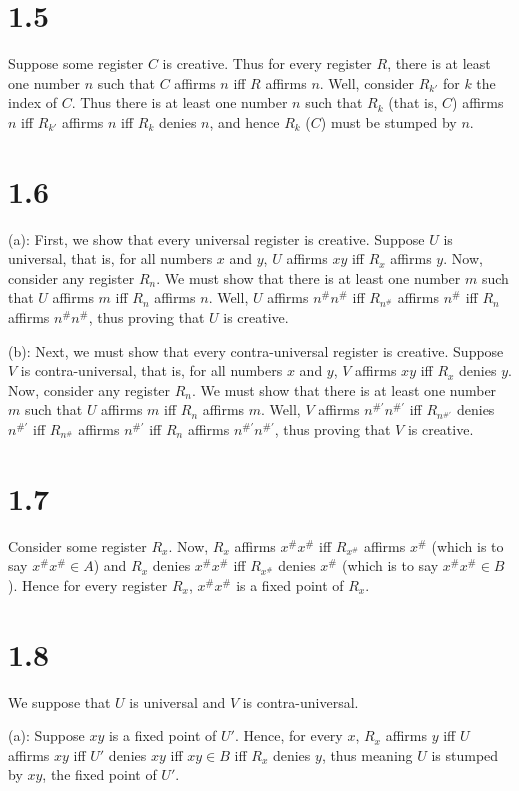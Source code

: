 \documentclass{article}
\theoremstyle{definition}
\begin{document}
\section*{1.5}
Suppose some register $C$ is creative. Thus for every register $R$, there is at least one number $n$ such that $C$ affirms $n$ iff $R$ affirms $n$. Well, 
consider $R_{k'}$ for $k$ the index of $C$. Thus there is at least one number $n$ such that $R_k$ (that is, $C$) affirms $n$ iff 
$R_{k'}$ affirms $n$ iff $R_k$ denies $n$, and hence $R_k$ ($C$) must be stumped by $n$.

\section*{1.6}
(a): First, we show that every universal register is creative. Suppose $U$ is universal, that is, for all numbers $x$ and $y$, $U$ affirms 
$xy$ iff $R_x$ affirms $y$. Now, consider any register $R_n$. We must show that there is at least one number $m$ such that $U$ affirms $m$ iff 
$R_n$ affirms $n$. Well, $U$ affirms $n^\#n^\#$ iff $R_{n^\#}$ affirms $n^\#$ iff $R_n$ affirms $n^\#n^\#$, thus proving that $U$ is creative.


(b): Next, we must show that every contra-universal register is creative. Suppose $V$ is contra-universal, that is, for all numbers $x$ and $y$,
$V$ affirms $xy$ iff $R_x$ denies $y$. Now, consider any register $R_n$. We must show that there is at least one number $m$ such that $U$ affirms $m$ 
iff $R_n$ affirms $m$. Well, $V$ affirms $n^{\#'}n^{\#'}$ iff $R_{n^{\#'}}$ denies $n^{\#'}$ iff $R_{n^\#}$ affirms $n^{\#'}$ iff 
$R_n$ affirms $n^{\#'}n^{\#'}$, thus proving that $V$ is creative. 

\section*{1.7}
Consider some register $R_x$. Now, $R_x$ affirms $x^\#x^\#$ iff $R_{x^\#}$ affirms $x^\#$ (which is to say $x^\#x^\#\in A$) and $R_x$ denies $x^\#x^\#$ iff 
$R_{x^\#}$ denies $x^\#$ (which is to say $x^\#x^\#\in B$). Hence for every register $R_x$, $x^\#x^\#$ is a fixed point of $R_x$.

\section*{1.8}
We suppose that $U$ is universal and $V$ is contra-universal.


(a): Suppose $xy$ is a fixed point of $U'$. Hence, for every $x$, 
$R_x$ affirms $y$ iff $U$ affirms $xy$ iff $U'$ denies $xy$ iff $xy\in B$ iff $R_x$ denies $y$, 
thus meaning $U$ is stumped by $xy$, the fixed point of $U'$.
\end{document}
